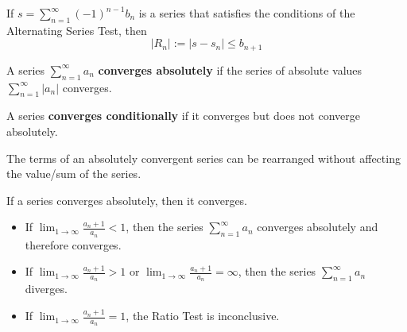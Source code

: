 \begin{theorem} If $s = \sum_{n=1}^\infty (-1)^{n - 1} b_n$ is a series that satisfies the conditions of the Alternating Series Test, then
  \[
    |R_n| := |s - s_n| \leq b_{n + 1}
  \]
\end{theorem}

\begin{definition} A series $\sum_{n = 1}^\infty a_n$ \textbf{converges absolutely} if the series of absolute values $\sum_{n = 1}^\infty |a_n|$ converges.
\end{definition}

\begin{definition} A series \textbf{converges conditionally} if it converges but does not converge absolutely.
\end{definition}

\begin{theorem} The terms of an absolutely convergent series can be rearranged without affecting the value/sum of the series.
\end{theorem}

\begin{theorem} If a series converges absolutely, then it converges.
\end{theorem}

\begin{theorem}
  \begin{itemize}
    \item If ${\lim\limits}_{1 \to \infty} \frac{a_n + 1}{a_n} < 1$, then the series ${\sum\limits}_{n=1}^\infty a_n$ converges absolutely and therefore converges.
    \item If ${\lim\limits}_{1 \to \infty} \frac{a_n + 1}{a_n} > 1$ or ${\lim\limits}_{1 \to \infty} \frac{a_n + 1}{a_n} = \infty$, then the series ${\sum\limits}_{n=1}^\infty a_n$ diverges.
    \item If ${\lim\limits}_{1 \to \infty} \frac{a_n + 1}{a_n} = 1$, the Ratio Test is inconclusive.
  \end{itemize}
\end{theorem}


